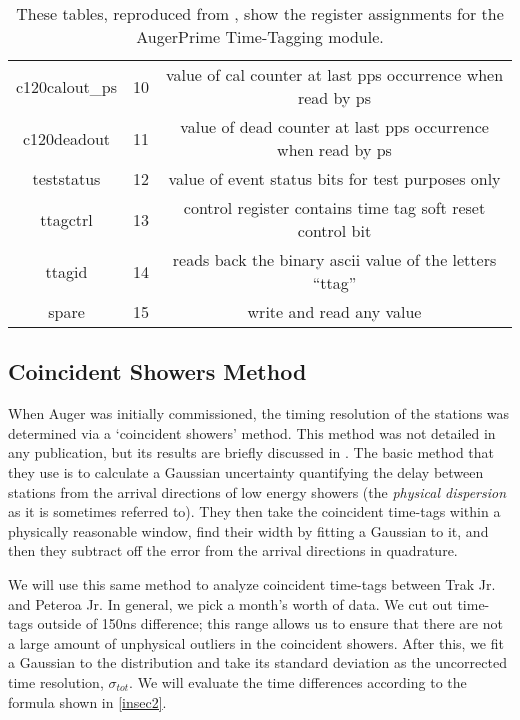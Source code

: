 \begin{table}
\begin{center}
\begin{tiny}
\begin{tabular}{c c c}
c120calout\_ps&10&value of cal counter at last pps occurrence when read by ps \\
c120deadout&11&value of dead counter at last pps occurrence when read by ps \\
teststatus&12&value of event status bits for test purposes only \\
ttagctrl&13&control register contains time tag soft reset control bit \\
ttagid&14&reads back the binary ascii value of the letters ``ttag''\\
spare&15&write and read any value \\
\end{tabular}
\end{tiny}
\end{center}
\caption[Table of Register Assignments]{These tables, reproduced from \textcite{bobttag}, show the register assignments for the AugerPrime Time-Tagging module.}
\label{ttagspec}
\end{table}

\subsection{Coincident Showers Method}
When Auger was initially commissioned, the timing resolution of the stations was determined via a `coincident showers' method. This method was not detailed in any publication, but its results are briefly discussed in \textcite{fddiam}. The basic method that they use is to calculate a Gaussian uncertainty quantifying the delay between stations from the arrival directions of low energy showers (the \textit{physical dispersion} as it is sometimes referred to). They then take the coincident time-tags within a physically reasonable window, find their width by fitting a Gaussian to it, and then they subtract off the error from the arrival directions in quadrature. 

We will use this same method to analyze coincident time-tags between Trak Jr. and Peteroa Jr. In general, we pick a month's worth of data. We cut out time-tags outside of 150ns difference; this range allows us to ensure that there are not a large amount of unphysical outliers in the coincident showers. After this, we fit a Gaussian to the distribution and take its standard deviation as the uncorrected time resolution, $\sigma_{tot}$. We will evaluate the time differences according to the formula shown in \autoref{insec2}.

